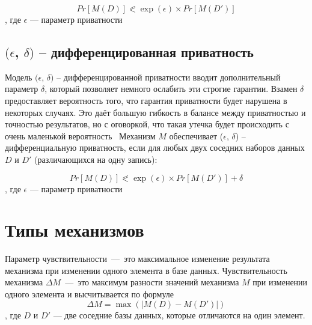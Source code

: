 

\begin{equation}\label{equ:eps-diff}
	Pr[M(D)] \eqslantless \exp(\epsilon) \times Pr[M(D')]
\end{equation}
, где $\epsilon$ --- параметр приватности

\subsection{$(\epsilon$, $\delta)$ -- дифференцированная приватность}
Модель $(\epsilon$, $\delta)$ -- дифференцированной приватности вводит дополнительный параметр $\delta$, который позволяет немного ослабить эти строгие гарантии.
Взамен $\delta$ предоставляет вероятность того, что гарантия приватности будет нарушена в некоторых случаях.
Это даёт большую гибкость в балансе между приватностью и точностью результатов, но с оговоркой, что такая утечка будет происходить с очень маленькой вероятность~\cite{main}
Механизм $M$ обеспечивает ($\epsilon$, $\delta$) -- дифференциальную приватность, если для любых двух соседних наборов данных $D$ и $D'$ (различающихся на одну запись):

\begin{equation}\label{equ:eps-delta-diff}
	Pr[M(D)] \eqslantless \exp(\epsilon) \times Pr[M(D')] + \delta
\end{equation}
, где $\epsilon$ --- параметр приватности



\section{Типы механизмов}

Параметр чувствительности~---~это максимальное изменение результата механизма при изменении одного элемента в базе данных. Чувствительность механизма $\Delta M$~---~это максимум разности значений механизма $M$ при изменении одного элемента и высчитывается по формуле~\:
\begin{equation}\label{eq:laplas}
	\Delta M  = \max(|M(D) - M(D')|)
\end{equation}
, где $D$ и $D'$ --- две соседние базы данных, которые отличаются на один элемент.

